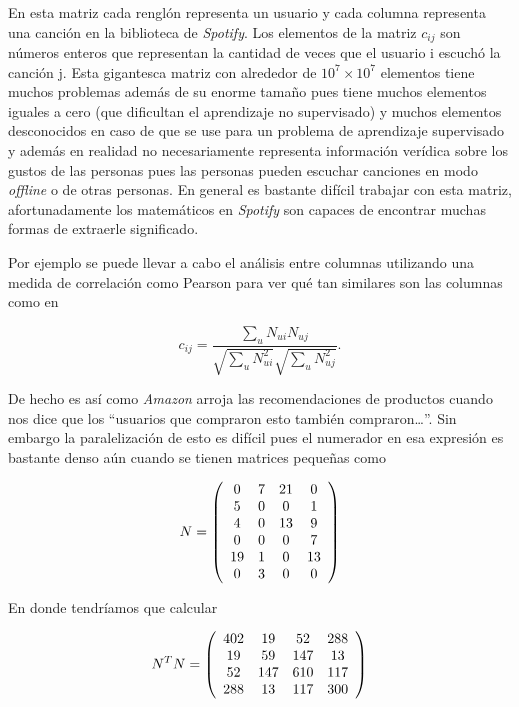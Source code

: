 En esta matriz cada renglón representa un usuario y cada columna representa una canción en la biblioteca de \textit{Spotify}. Los elementos de la matriz $c_{ ij }$ son números enteros que representan la cantidad de veces que el usuario i escuchó la canción j. Esta gigantesca matriz con alrededor de $10^7 \times 10^7$ elementos tiene muchos problemas además de su enorme tamaño pues tiene muchos elementos iguales a cero (que dificultan el aprendizaje no supervisado) y muchos elementos desconocidos en caso de que se use para un problema de aprendizaje supervisado y además en realidad no necesariamente representa información verídica sobre los gustos de las personas pues las personas pueden escuchar canciones en modo \textit{offline} o de otras personas. En general es bastante difícil trabajar con esta matriz, afortunadamente los matemáticos en \textit{Spotify} son capaces de encontrar muchas formas de extraerle significado.

Por ejemplo se puede llevar a cabo el análisis entre columnas utilizando una medida de correlación como Pearson para ver qué tan similares son las columnas como en

$$c _ { i j } = \frac { \sum _ { u } N _ { u i } N _ { u j } } { \sqrt { \sum _ { u } N _ { u i } ^ { 2 } } \sqrt { \sum _ { u } N _ { u j } ^ { 2 } } }.$$

De hecho es así como \textit{Amazon} arroja las recomendaciones de productos cuando nos dice que los ``usuarios que compraron esto también compraron…''. Sin embargo la paralelización de esto es difícil pues el numerador en esa expresión es bastante denso aún cuando se tienen matrices pequeñas como

$$N = \left( \begin{array} { c c c c } { 0 } & { 7 } & { 21 } & { 0 } \\ { 5 } & { 0 } & { 0 } & { 1 } \\ { 4 } & { 0 } & { 13 } & { 9 } \\ { 0 } & { 0 } & { 0 } & { 7 } \\ { 19 } & { 1 } & { 0 } & { 13 } \\ { 0 } & { 3 } & { 0 } & { 0 } \end{array} \right)$$

En donde tendríamos que calcular 

$$N ^ { T } N = \left( \begin{array} { c c c c } { 402 } & { 19 } & { 52 } & { 288 } \\ { 19 } & { 59 } & { 147 } & { 13 } \\ { 52 } & { 147 } & { 610 } & { 117 } \\ { 288 } & { 13 } & { 117 } & { 300 } \end{array} \right)$$


